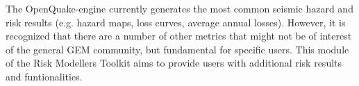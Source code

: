 The OpenQuake-engine currently generates the most common seismic hazard and risk results (e.g. hazard maps, loss curves, average annual losses). However, it is recognized that there are a number of other metrics that might not be of interest of the general GEM community, but fundamental for specific users. This module of the Risk Modellers Toolkit aims to provide users with additional risk results and funtionalities.